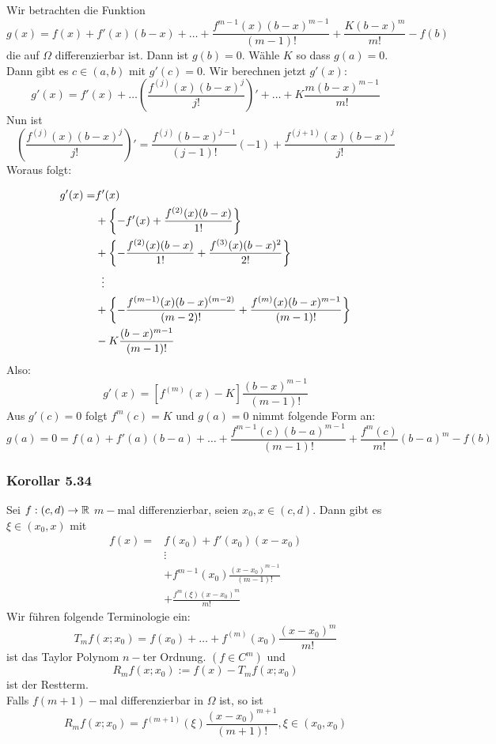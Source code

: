 \begin{beweis}{}
Wir betrachten die Funktion
\[g(x)=f(x)+f'(x)(b-x)+\dots+\frac{f^{m-1}(x)(b-x)^{m-1}}{(m-1)!}+\frac{K(b-x)^m}{m!}-f(b)\]
die auf $\Omega$ differenzierbar ist. Dann ist $g(b)=0$. Wähle $K$ so dass $g(a)=0$. Dann gibt es $c\in (a,b)$ mit $g'(c)=0$. Wir berechnen jetzt $g'(x)$:
\[g'(x)=f'(x)+\dots \left( \frac{f^{(j)}(x)(b-x)^j}{j!}\right)'+\dots+K\frac{m(b-x)^{m-1}}{m!}\]
Nun ist
\[\left( \frac{f^{(j)}(x)(b-x)^j}{j!}\right)'=\frac{f^{(j)}(b-x)^{j-1}}{(j-1)!}(-1)+\frac{f^{(j+1)}(x)(b-x)^{j}}{j!}\]
Woraus folgt:

\begin{align*}
g'(x)=&f'(x)\\
&+\left\{ -f'(x)+\frac{f^{(2)}{(x)(b-x)}}{1!}\right\}\\
&+\left\{ -\frac{f^{(2)}(x)(b-x)}{1!}+ \frac{f^{(3)}(x)(b-x)^2}{2!} \right\}\\
&\hspace{2mm}\vdots\\
&+\left\{ -\frac{f^{(m-1)}(x)(b-x)^{(m-2)}}{(m-2)!}+ \frac{f^{(m)}(x)(b-x)^{m-1}}{(m-1)!} \right\}\\
&-K\frac{(b-x)^{m-1}}{(m-1)!}
\end{align*}
Also: \[g'(x)=\left[ f^{(m)}(x)-K\right]\frac{(b-x)^{m-1}}{(m-1)!}\]
Aus $g'(c)=0$ folgt $\boxed{f^m(c)=K}$ und $g(a)=0$ nimmt folgende Form an:
\[g(a)=0=f(a)+f'(a)(b-a)+\dots+\frac{f^{m-1}(c)(b-a)^{m-1}}{(m-1)!}+\frac{f^m(c)}{m!}(b-a)^m-f(b)\]
\end{beweis}

\subsubsection*{Korollar 5.34}
Sei $f:(c,d)\to\mathbb{R}$ $m-$mal differenzierbar, seien $x_0,x\in (c,d)$. Dann gibt es $\xi\in (x_0,x)$ mit
\begin{align*}
f(x)=&f(x_0)+f'(x_0)(x-x_0)\\
&\vdots \\
&+f^{m-1}(x_0)\frac{(x-x_0)^{m-1}}{(m-1)!}\\
&+\frac{f^m(\xi)(x-x_0)^m}{m!}
\end{align*}
Wir führen folgende Terminologie ein:
\[T_mf(x;x_0) = f(x_0)+\dots+f^{(m)}(x_0)\frac{(x-x_0)^m}{m!}\]
ist das Taylor Polynom $n-$ter Ordnung. $\left( f\in C^m\right)$ und
\[R_mf(x;x_0):=f(x)-T_mf(x;x_0)\]
ist der Restterm. \\

Falls $f(m+1)-$mal differenzierbar in $\Omega$ ist, so ist
\[R_mf(x;x_0)=f^{(m+1)}(\xi)\frac{\left( x-x_0\right)^{m+1}}{(m+1)!}, \xi\in\left( x_0,x_0\right)\]

